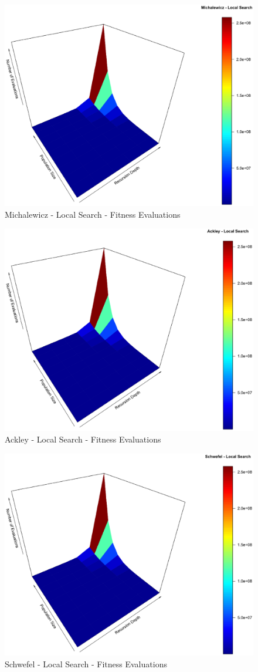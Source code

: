 \documentclass{svproc}
\begin{document}
\begin{figure}[tbp]
\centering
\includegraphics[width=1.0\hsize,height=0.65\hsize]{fig04.eps}
\caption{Michalewicz - Local Search - Fitness Evaluations}
\label{fig21}
\end{figure}

\begin{figure}[tbp]
\centering
\includegraphics[width=1.0\hsize,height=0.65\hsize]{fig07.eps}
\caption{Ackley - Local Search - Fitness Evaluations}
\label{fig22}
\end{figure}

\begin{figure}[tbp]
\centering
\includegraphics[width=1.0\hsize,height=0.65\hsize]{fig10.eps}
\caption{Schwefel - Local Search - Fitness Evaluations}
\label{fig23}
\end{figure}
\end{document}
